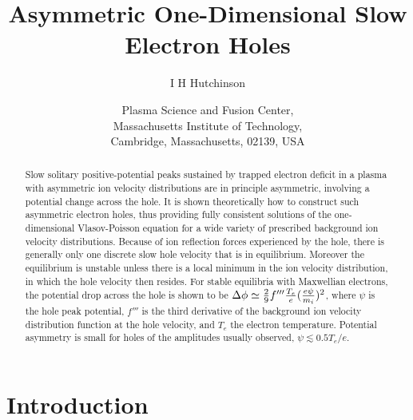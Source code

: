 \documentclass[12pt]{article}
\title{Asymmetric One-Dimensional Slow Electron Holes}
\author{I H Hutchinson}
\date{Plasma Science and Fusion Center,\\ Massachusetts Institute of
  Technology,\\ Cambridge, Massachusetts, 02139, USA}
\begin{document}
\maketitle
\begin{abstract}
  Slow solitary positive-potential peaks sustained by trapped electron
  deficit in a plasma with asymmetric ion velocity distributions are
  in principle asymmetric, involving a potential change across the
  hole.  It is shown theoretically how to construct such asymmetric
  electron holes, thus providing fully consistent solutions of the
  one-dimensional Vlasov-Poisson equation for a wide variety of
  prescribed background ion velocity distributions. Because of ion
  reflection forces experienced by the hole, there is generally only
  one discrete slow hole velocity that is in equilibrium. Moreover the
  equilibrium is unstable unless there is a local minimum in the ion
  velocity distribution, in which the hole velocity then resides. For
  stable equilibria with Maxwellian electrons, the potential drop
  across the hole is shown to be
  $\Delta\phi\simeq{2\over 9}f'''{T_e\over e}({e\psi\over m_i})^2$, where
  $\psi$ is the hole peak potential, $f'''$ is the third derivative of
  the background ion velocity distribution function at the hole
  velocity, and $T_e$ the electron temperature. Potential asymmetry is
  small for holes of the amplitudes usually observed,
  $\psi\lesssim 0.5T_e/e$.
\end{abstract}

\section{Introduction}
\end{document}
